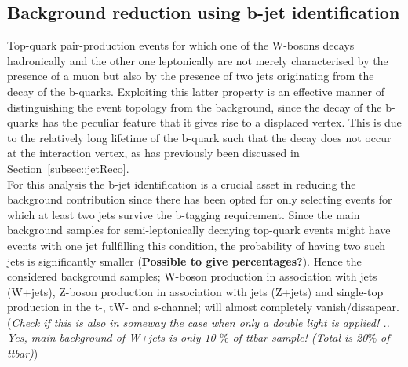
\subsection{Background reduction using b-jet identification}\label{subsec::BTag}

Top-quark pair-production events for which one of the W-bosons decays hadronically and the other one leptonically are not merely characterised by the presence of a muon but also by the presence of two jets originating from the decay of the b-quarks.
Exploiting this latter property is an effective manner of distinguishing the event topology from the background, since the decay of the b-quarks has the peculiar feature that it gives rise to a displaced vertex. This is due to the relatively long lifetime of the b-quark such that the decay does not occur at the interaction vertex, as has previously been discussed in Section~\ref{subsec::jetReco}.
\\ 

For this analysis the b-jet identification is a crucial asset in reducing the background contribution since there has been opted for only selecting events for which at least two jets survive the b-tagging requirement. Since the main background samples for semi-leptonically decaying top-quark events might have events with one jet fullfilling this condition, the probability of having two such jets is significantly smaller (\textbf{Possible to give percentages?}). Hence the considered background samples; W-boson production in association with jets (W+jets), Z-boson production in association with jets (Z+jets) and single-top production in the t-, tW- and s-channel; will almost completely vanish/dissapear. (\textit{Check if this is also in someway the case when only a double light is applied! .. Yes, main background of W+jets is only 10 $\%$ of ttbar sample! (Total is 20$\%$ of ttbar)})
\\

